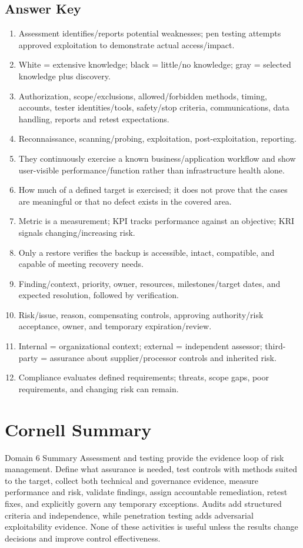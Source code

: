 \documentclass[10pt,letterpaper]{article}
\begin{document}
\subsection*{\color{teal}Answer Key}
\begin{enumerate}
\item Assessment identifies/reports potential weaknesses; pen testing attempts approved exploitation to demonstrate actual access/impact.
\item White = extensive knowledge; black = little/no knowledge; gray = selected knowledge plus discovery.
\item Authorization, scope/exclusions, allowed/forbidden methods, timing, accounts, tester identities/tools, safety/stop criteria, communications, data handling, reports and retest expectations.
\item Reconnaissance, scanning/probing, exploitation, post-exploitation, reporting.
\item They continuously exercise a known business/application workflow and show user-visible performance/function rather than infrastructure health alone.
\item How much of a defined target is exercised; it does not prove that the cases are meaningful or that no defect exists in the covered area.
\item Metric is a measurement; KPI tracks performance against an objective; KRI signals changing/increasing risk.
\item Only a restore verifies the backup is accessible, intact, compatible, and capable of meeting recovery needs.
\item Finding/context, priority, owner, resources, milestones/target dates, and expected resolution, followed by verification.
\item Risk/issue, reason, compensating controls, approving authority/risk acceptance, owner, and temporary expiration/review.
\item Internal = organizational context; external = independent assessor; third-party = assurance about supplier/processor controls and inherited risk.
\item Compliance evaluates defined requirements; threats, scope gaps, poor requirements, and changing risk can remain.
\end{enumerate}

\section{\color{navy}Cornell Summary}
\begin{summarybox}{Domain 6 Summary}
Assessment and testing provide the evidence loop of risk management. Define what assurance is needed, test controls with methods suited to the target, collect both technical and governance evidence, measure performance and risk, validate findings, assign accountable remediation, retest fixes, and explicitly govern any temporary exceptions. Audits add structured criteria and independence, while penetration testing adds adversarial exploitability evidence. None of these activities is useful unless the results change decisions and improve control effectiveness.
\end{summarybox}
\end{document}
